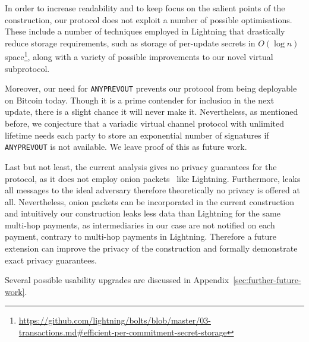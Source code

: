   In order to increase readability and to keep focus on the salient points of
  the construction, our protocol does not exploit a number of possible
  optimisations. These include a number of techniques employed in Lightning that
  drastically reduce storage requirements, such as storage of per-update secrets
  in $O(\log n)$
  space\footnote{\url{https://github.com/lightning/bolts/blob/master/03-transactions.md\#efficient-per-commitment-secret-storage}},
  along with a variety of possible improvements to our novel virtual
  subprotocol.

  Moreover, our need for \texttt{ANYPREVOUT} prevents our protocol from being
  deployable on Bitcoin today. Though it is a prime contender for inclusion
  in the next update, there is a slight chance it will never make it.
  Nevertheless, as mentioned before, we conjecture that a variadic virtual
  channel protocol with unlimited lifetime needs each party to store an
  exponential number of signatures if \texttt{ANYPREVOUT} is not available. We
  leave proof of this as future work.

  Last but not least, the current analysis gives no privacy guarantees for the
  protocol, as it does not employ onion packets~\cite{sphinx} like Lightning.
  Furthermore, \fchan leaks all messages to the ideal adversary therefore
  theoretically no privacy is offered at all. Nevertheless, onion packets can be
  incorporated in the current construction and intuitively our construction
  leaks less data than Lightning for the same multi-hop payments, as
  intermediaries in our case are not notified on each payment, contrary to
  multi-hop payments in Lightning. Therefore a future extension can improve the
  privacy of the construction and formally demonstrate exact privacy guarantees.

  Several possible usability upgrades are discussed in
  Appendix~\ref{sec:further-future-work}.
